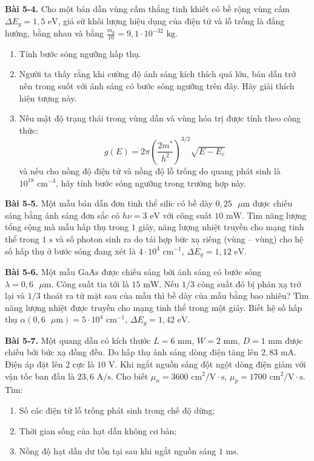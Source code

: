 \expandafter\def\csname debai@5-4\endcsname{
\textbf{Bài 5-4.} Cho một bán dẫn vùng cấm thẳng tinh khiết có bề rộng vùng cấm $\Delta E_g = 1{,}5\text{ eV}$, giả sử khối lượng hiệu dụng của điện tử và lỗ trống là đẳng hướng, bằng nhau và bằng $\frac{m_0}{10} = 9{,}1 \cdot 10^{-32}\text{ kg}$.
\begin{enumerate}[label=\alph*)]
  \item Tính bước sóng ngưỡng hấp thụ.
  \item Người ta thấy rằng khi cường độ ánh sáng kích thích quá lớn, bán dẫn trở nên trong suốt với ánh sáng có bước sóng ngưỡng trên đây. Hãy giải thích hiện tượng này.
  \item Nếu mật độ trạng thái trong vùng dẫn và vùng hóa trị được tính theo công thức:
  \begin{equation*}
      g(E) = 2\pi\left(\frac{2m^*}{h^2}\right)^{3/2}\sqrt{E - E_c}
  \end{equation*}
  và nếu cho nồng độ điện tử và nồng độ lỗ trống do quang phát sinh là $10^{18}\text{ cm}^{-3}$, hãy tính bước sóng ngưỡng trong trường hợp này.
\end{enumerate}
}

\expandafter\def\csname debai@5-5\endcsname{
\textbf{Bài 5-5.} Một mẫu bán dẫn đơn tinh thể silic có bề dày $0{,}25\text{ }\mu\text{m}$ được chiếu sáng bằng ánh sáng đơn sắc có $h\nu = 3\text{ eV}$ với công suất $10\text{ mW}$. Tìm năng lượng tổng cộng mà mẫu hấp thụ trong $1$ giây, năng lượng nhiệt truyền cho mạng tinh thể trong $1\text{ s}$ và số photon sinh ra do tái hợp bức xạ riêng (vùng -- vùng) cho hệ số hấp thụ ở bước sóng đang xét là $4 \cdot 10^4\text{ cm}^{-1}$, $\Delta E_g = 1{,}12\text{ eV}$.
}

\expandafter\def\csname debai@5-6\endcsname{
\textbf{Bài 5-6.} Một mẫu GaAs được chiếu sáng bởi ánh sáng có bước sóng $\lambda = 0{,}6\text{ }\mu\text{m}$. Công suất tia tới là $15\text{ mW}$. Nếu $1/3$ công suất đó bị phản xạ trở lại và $1/3$ thoát ra từ mặt sau của mẫu thì bề dày của mẫu bằng bao nhiêu? Tìm năng lượng nhiệt được truyền cho mạng tinh thể trong một giây. Biết hệ số hấp thụ $\alpha(0{,}6\text{ }\mu\text{m}) = 5 \cdot 10^4\text{ cm}^{-1}$, $\Delta E_g = 1{,}42\text{ eV}$.
}

\expandafter\def\csname debai@5-7\endcsname{
\textbf{Bài 5-7.} Một quang dẫn có kích thước $L = 6\text{ mm}$, $W = 2\text{ mm}$, $D = 1\text{ mm}$ được chiếu bởi bức xạ đồng đều. Do hấp thụ ánh sáng dòng điện tăng lên $2{,}83\text{ mA}$. Điện áp đặt lên $2$ cực là $10\text{ V}$. Khi ngắt nguồn sáng đột ngột dòng điện giảm với vận tốc ban đầu là $23{,}6\text{ A/s}$. Cho biết $\mu_n = 3600\text{ cm}^2/\text{V}\cdot\text{s}$, $\mu_p = 1700\text{ cm}^2/\text{V}\cdot\text{s}$.\\
Tìm:
\begin{enumerate}[label=\alph*)]
  \item Số các điện tử lỗ trống phát sinh trong chế độ dừng;
  \item Thời gian sống của hạt dẫn không cơ bản;
  \item Nồng độ hạt dẫn dư tồn tại sau khi ngắt nguồn sáng $1\text{ ms}$.
\end{enumerate}
}
